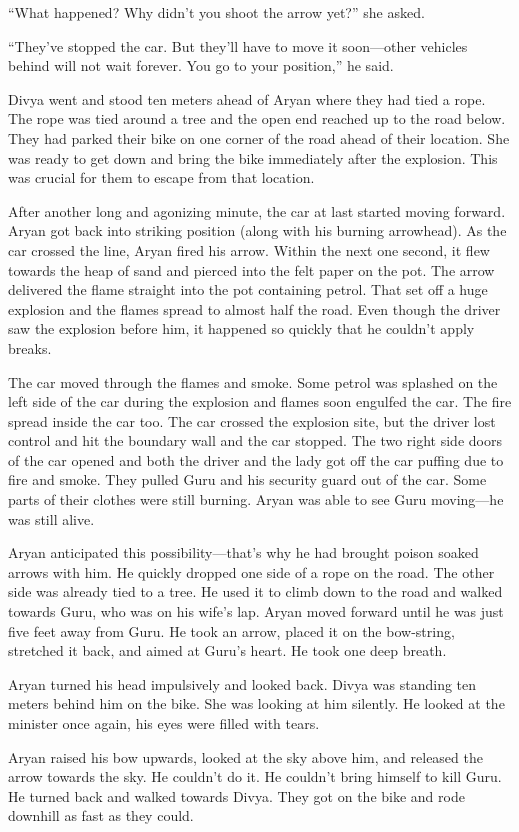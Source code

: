 “What happened? Why didn't you shoot the arrow yet?” she asked.

“They've stopped the car. But they'll have to move it soon—other vehicles
behind will not wait forever. You go to your position,” he said.

Divya went and stood ten meters ahead of Aryan where they had tied a rope. The
rope was tied around a tree and the open end reached up to the road below. They
had parked their bike on one corner of the road ahead of their location. She was
ready to get down and bring the bike immediately after the explosion. This was
crucial for them to escape from that location.

After another long and agonizing minute, the car at last started moving forward.
Aryan got back into striking position (along with his burning arrowhead). As the
car crossed the line, Aryan fired his arrow. Within the next one second, it flew
towards the heap of sand and pierced into the felt paper on the pot. The arrow
delivered the flame straight into the pot containing petrol. That set off a
huge explosion and the flames spread to almost half the road. Even though the
driver saw the explosion before him, it happened so quickly that he couldn't
apply breaks.

The car moved through the flames and smoke. Some petrol was splashed
on the left side of the car during the explosion and flames soon engulfed the
car. The fire spread inside the car too. The car crossed the explosion site, but
the driver lost control and hit the boundary wall and the car stopped. The two
right side doors of the car opened and both the driver and the lady got off the
car puffing due to fire and smoke. They pulled Guru and his security guard out
of the car. Some parts of their clothes were still burning. Aryan was able to
see Guru moving—he was still alive.

Aryan anticipated this possibility—that's why he had brought poison soaked
arrows with him. He quickly dropped one side of a rope on the road. The other
side was already tied to a tree. He used it to climb down to the road and walked
towards Guru, who was on his wife's lap. Aryan moved forward until he was just
five feet away from Guru. He took an arrow, placed it on the bow-string,
stretched it back, and aimed at Guru's heart. He took one deep breath.

Aryan turned his head impulsively and looked back. Divya was standing ten meters
behind him on the bike. She was looking at him silently. He looked at the
minister once again, his eyes were filled with tears.

Aryan raised his bow upwards, looked at the sky above him, and released the
arrow towards the sky. He couldn't do it. He couldn't bring himself to kill
Guru. He turned back and walked towards Divya. They got on the bike and rode
downhill as fast as they could.